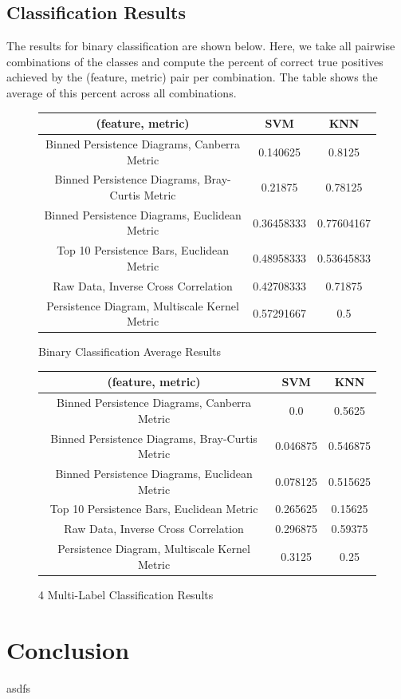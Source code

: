 \documentclass[12pt]{article}
\begin{document}
\subsection{Classification Results}
\-\hspace{1cm} The results for binary classification are shown below. Here, we
take all pairwise combinations of the classes and compute the percent of
correct true positives achieved by the (feature, metric) pair per combination.
The table shows the average of this percent across all combinations.
\begin{figure}[!ht]
\begin{center}
\begin{tabular}{||c|c|c||}
\hline
(feature, metric) & SVM & KNN \\ 
\hline 
Binned Persistence Diagrams, Canberra Metric & 0.140625 & 0.8125 \\ 
\hline
Binned Persistence Diagrams, Bray-Curtis Metric & 0.21875 & 0.78125 \\
\hline 
Binned Persistence Diagrams, Euclidean Metric & 0.36458333 & 0.77604167 \\ 
\hline
Top 10 Persistence Bars, Euclidean Metric & 0.48958333 & 0.53645833 \\
\hline
Raw Data, Inverse Cross Correlation & 0.42708333 & 0.71875 \\
\hline
Persistence Diagram, Multiscale Kernel Metric & 0.57291667 & 0.5 \\
\hline
\end{tabular}
\end{center}
\caption{Binary Classification Average Results}
\end{figure}

\begin{figure}[!ht]
\begin{center}
\begin{tabular}{||c|c|c||}
\hline
(feature, metric) & SVM & KNN \\ 
\hline 
Binned Persistence Diagrams, Canberra Metric & 0.0 & 0.5625 \\ 
\hline
Binned Persistence Diagrams, Bray-Curtis Metric & 0.046875 & 0.546875 \\
\hline 
Binned Persistence Diagrams, Euclidean Metric & 0.078125 & 0.515625 \\ 
\hline
Top 10 Persistence Bars, Euclidean Metric & 0.265625 & 0.15625 \\
\hline
Raw Data, Inverse Cross Correlation & 0.296875 & 0.59375 \\
\hline
Persistence Diagram, Multiscale Kernel Metric & 0.3125 & 0.25 \\
\hline
\end{tabular}
\end{center}
\caption{4 Multi-Label Classification Results}
\end{figure}
	
\section{Conclusion}
asdfs
\end{document}
